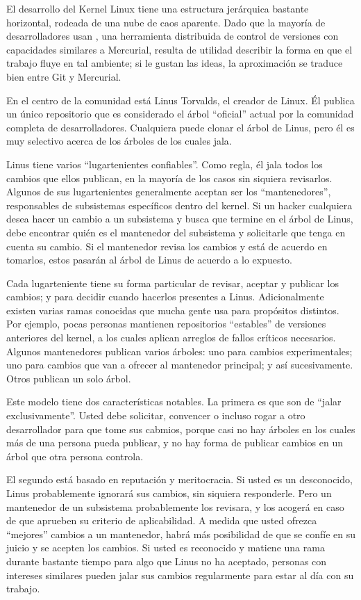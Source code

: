 El desarrollo del Kernel Linux tiene una estructura jerárquica
bastante horizontal, rodeada de una nube de caos aparente. Dado que la
mayoría de desarrolladores usan , una herramienta distribuida
de control de versiones con capacidades similares a Mercurial, resulta
de utilidad describir la forma en que el trabajo fluye en tal
ambiente; si le gustan las ideas, la aproximación se traduce bien
entre Git y Mercurial.

En el centro de la comunidad está Linus Torvalds, el creador de Linux.
Él publica un único repositorio que es considerado el árbol
``oficial'' actual por la comunidad completa de
desarrolladores. Cualquiera puede clonar el árbol de Linus, pero él es
muy selectivo acerca de los árboles de los cuales jala.

Linus tiene varios ``lugartenientes confiables''.  Como regla, él jala
todos los cambios que ellos publican, en la mayoría de los casos sin
siquiera revisarlos.  Algunos de sus lugartenientes generalmente
aceptan ser los ``mantenedores'', responsables de subsistemas
específicos dentro del kernel.  Si un hacker cualquiera desea hacer un
cambio a un subsistema y busca que termine en el árbol de Linus, debe
encontrar quién es el mantenedor del subsistema y solicitarle que
tenga en cuenta su cambio.  Si el mantenedor revisa los cambios y está
de acuerdo en tomarlos, estos pasarán al árbol de Linus de acuerdo a
lo expuesto.

Cada lugarteniente tiene su forma particular de revisar, aceptar y
publicar los cambios; y para decidir cuando hacerlos presentes a
Linus.  Adicionalmente existen varias ramas conocidas que mucha gente
usa para propósitos distintos. Por ejemplo, pocas personas mantienen
repositorios ``estables'' de versiones anteriores del kernel, a los
cuales aplican arreglos de fallos críticos necesarios. Algunos
mantenedores publican varios árboles: uno para cambios
experimentales; uno para cambios que van a ofrecer al mantenedor
principal; y así sucesivamente. Otros publican un solo árbol.

Este modelo tiene dos características notables. La primera es que son
de ``jalar exclusivamente''.  Usted debe solicitar, convencer o
incluso rogar a otro desarrollador para que tome sus cabmios, porque
casi no hay árboles en los cuales más de una persona pueda publicar, y
no hay forma de publicar cambios en un árbol que otra persona controla.

El segundo está basado en reputación y meritocracia.  Si usted es un
desconocido, Linus probablemente ignorará sus cambios, sin siquiera
responderle.  Pero un mantenedor de un subsistema probablemente los
revisara, y los acogerá en caso de que aprueben su criterio de
aplicabilidad.  A medida que usted ofrezca ``mejores'' cambios a un
mantenedor, habrá más posibilidad de que se confíe en su juicio y se
acepten los cambios.   Si usted es reconocido y matiene una rama
durante bastante tiempo para algo que Linus no ha aceptado, personas
con intereses similares pueden jalar sus cambios regularmente para
estar al día con su trabajo.

